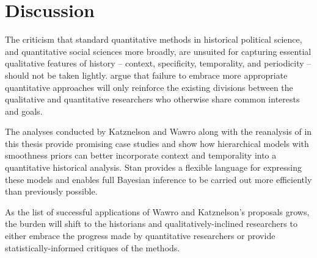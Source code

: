 \chapter{Discussion}
\label{discussion}

The criticism that standard quantitative methods in historical political science, and quantitative social sciences more broadly,  are unsuited for capturing essential qualitative features of history -- context, specificity, temporality, and periodicity -- should not be taken lightly.  argue that failure to embrace more appropriate quantitative approaches will only reinforce the existing divisions between the qualitative and quantitative researchers who otherwise share common interests and goals. 

The analyses conducted by Katznelson and Wawro along with the reanalysis of  in this thesis provide promising case studies and show how hierarchical models with smoothness priors can better incorporate context and temporality into a quantitative historical analysis. Stan provides a flexible language for expressing these models and enables full Bayesian inference to be carried out more efficiently than previously possible.  

As the list of successful applications of Wawro and Katznelson's proposals grows, the burden will shift to the historians and qualitatively-inclined researchers to either embrace the progress made by quantitative researchers or provide statistically-informed critiques of the methods. 

  